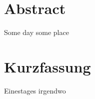 {
\let\cleardoublepage\relax
\chapter*{Abstract}
Some day some place
}
\chapter*{Kurzfassung}
Einestages irgendwo

